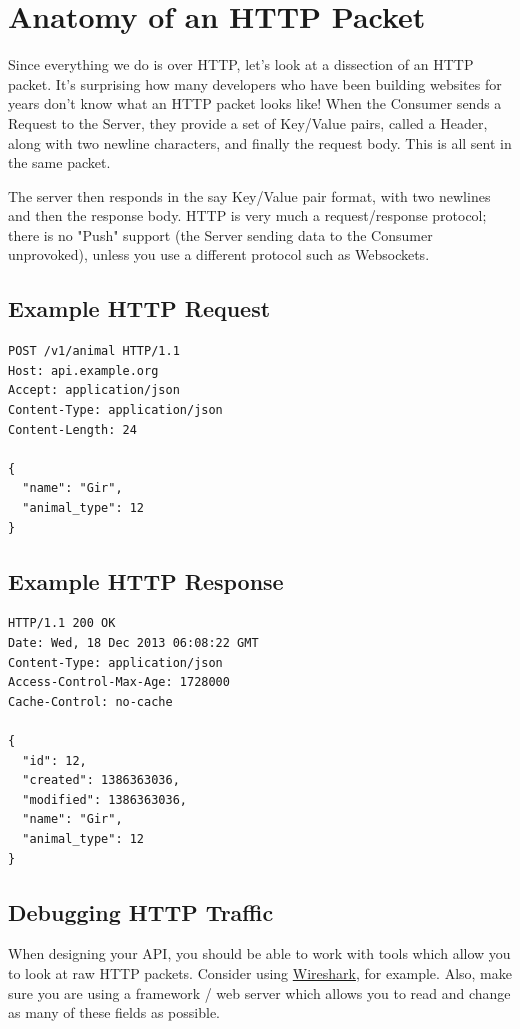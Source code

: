\documentclass{book}
\begin{document}
\section{Anatomy of an HTTP Packet}

Since everything we do is over HTTP, let's look at a dissection of an HTTP packet. It's surprising how many developers who have been building websites for years don't know what an HTTP packet looks like! When the Consumer sends a Request to the Server, they provide a set of Key/Value pairs, called a Header, along with two newline characters, and finally the request body. This is all sent in the same packet.

The server then responds in the say Key/Value pair format, with two newlines and then the response body. HTTP is very much a request/response protocol; there is no "Push" support (the Server sending data to the Consumer unprovoked), unless you use a different protocol such as Websockets.

\subsection{Example HTTP Request}

\begin{verbatim}
POST /v1/animal HTTP/1.1
Host: api.example.org
Accept: application/json
Content-Type: application/json
Content-Length: 24

{
  "name": "Gir",
  "animal_type": 12
}
\end{verbatim}

\subsection{Example HTTP Response}

\begin{verbatim}
HTTP/1.1 200 OK
Date: Wed, 18 Dec 2013 06:08:22 GMT
Content-Type: application/json
Access-Control-Max-Age: 1728000
Cache-Control: no-cache

{
  "id": 12,
  "created": 1386363036,
  "modified": 1386363036,
  "name": "Gir",
  "animal_type": 12
}
\end{verbatim}

\subsection{Debugging HTTP Traffic}

When designing your API, you should be able to work with tools which allow you to look at raw HTTP packets. Consider using \href{https://www.wireshark.org}{Wireshark}, for example. Also, make sure you are using a framework / web server which allows you to read and change as many of these fields as possible.
\end{document}
